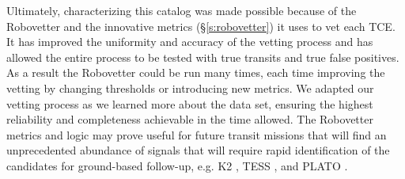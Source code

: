 Ultimately, characterizing this catalog was made possible because of the Robovetter and the innovative metrics (\S\ref{s:robovetter}) it uses to vet each TCE. It has improved the uniformity and accuracy of the vetting process and has allowed the entire process to be tested with true transits and true false positives. As a result the Robovetter could be run many times, each time improving the vetting by changing thresholds or introducing new metrics. We adapted our vetting process as we learned more about the data set, ensuring the highest reliability and completeness achievable in the time allowed.  The Robovetter metrics and logic may prove useful for future transit missions that will find an unprecedented abundance of signals that will require rapid identification of the candidates for ground-based follow-up, e.g. K2 \citep{Howell2014}, TESS \citep{Ricker2015}, and PLATO \citep{Rauer2016}. 


